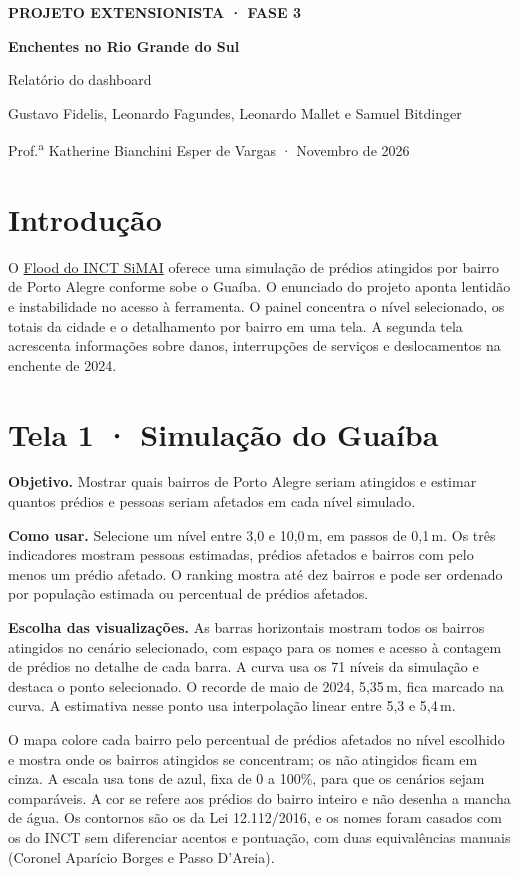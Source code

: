 \documentclass[11pt,a4paper]{article}
\begin{document}
{\color{verde}\small\bfseries PROJETO EXTENSIONISTA · FASE 3}\par
{\LARGE\bfseries\color{azul} Enchentes no Rio Grande do Sul}\par
{\large Relatório do dashboard}\par
{\small Gustavo Fidelis, Leonardo Fagundes, Leonardo Mallet e Samuel Bitdinger\par
Prof.\textsuperscript{a} Katherine Bianchini Esper de Vargas · Novembro de 2026}

\section*{\color{azul}Introdução}
O \href{http://vhlab.com.br/INCT/floods/}{Flood do INCT SiMAI} oferece uma simulação de
prédios atingidos por bairro de Porto Alegre conforme sobe o Guaíba. O enunciado do
projeto aponta lentidão e instabilidade no acesso à ferramenta. O painel concentra
o nível selecionado, os totais da cidade e o detalhamento por bairro em uma tela. A
segunda tela acrescenta informações sobre danos, interrupções de serviços e
deslocamentos na enchente de 2024.

\section*{\color{azul}Tela 1 · Simulação do Guaíba}
\textbf{Objetivo.} Mostrar quais bairros de Porto Alegre seriam atingidos e estimar
quantos prédios e pessoas seriam afetados em cada nível simulado.

\textbf{Como usar.} Selecione um nível entre 3,0 e 10,0\,m, em passos de 0,1\,m.
Os três indicadores mostram pessoas estimadas, prédios afetados e bairros com pelo
menos um prédio afetado. O ranking mostra até dez bairros e pode ser ordenado por
população estimada ou percentual de prédios afetados.

\textbf{Escolha das visualizações.} As barras horizontais mostram todos os bairros
atingidos no cenário selecionado, com espaço para os nomes e acesso à contagem de
prédios no detalhe de cada barra. A curva usa os 71 níveis da simulação e destaca
o ponto selecionado. O recorde de maio de 2024, 5,35\,m, fica marcado na curva. A
estimativa nesse ponto usa interpolação linear entre 5,3 e 5,4\,m.

O mapa colore cada bairro pelo percentual de prédios afetados no nível escolhido
e mostra onde os bairros atingidos se concentram; os não atingidos ficam em cinza.
A escala usa tons de azul, fixa de 0 a 100\%, para que os cenários sejam
comparáveis. A cor se refere aos prédios do bairro inteiro e não desenha a mancha
de água. Os contornos são os da Lei 12.112/2016, e os nomes foram casados com os do
INCT sem diferenciar acentos e pontuação, com duas equivalências manuais (Coronel
Aparício Borges e Passo D'Areia).
\end{document}
